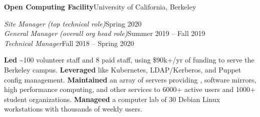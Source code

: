   \vspace{5pt}
  \textbf{Open Computing Facility}\quad{}\hfill University of California, Berkeley
  \begin{adjustwidth}{10pt}{}
    \emph{Site Manager (top technical role)}\hfill Spring 2020\\
    \emph{General Manager (overall org head role)}\hfill Summer 2019 -- Fall 2019\\
    \emph{Technical Manager}\hfill Fall 2018 -- Spring 2020

    \textbf{Led} \textasciitilde{}100 volunteer staff and 8 paid staff, using \$90k+/yr of funding to serve the Berkeley campus.
    \textbf{Leveraged}  like Kubernetes, LDAP/Kerberos, and Puppet config management.
    \textbf{Maintained} an array of servers providing , software mirrors, high performance computing, and other services to 6000+ active users and 1000+ student organizations.
    \textbf{Manageed} a computer lab of 30 Debian Linux workstations with thousands of weekly users.

  \end{adjustwidth}






